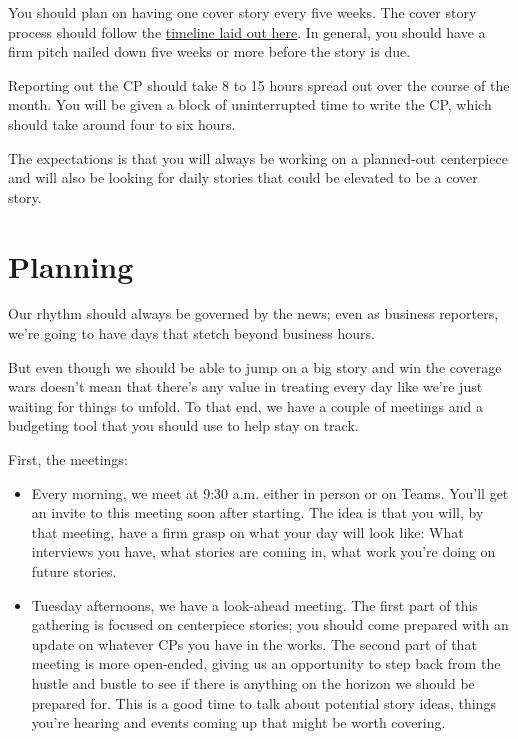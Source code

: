 \documentclass[
  11pt,
  american,
  letterpaperpaper,
  extrafontsizes,onecolumn,openright
  ]{memoir}
\providecommand{\tightlist}{%
  \setlength{\itemsep}{0pt}\setlength{\parskip}{0pt}}
\begin{document}
You should plan on having one cover story every five weeks. The cover story process should follow the \href{https://docs.google.com/spreadsheets/d/1NA5khaUA2TEatah0DSByH2hUVMbGpzMzeFEqfeBC0-Q/edit\#gid=1493329012}{timeline laid out here}. In general, you should have a firm pitch nailed down five weeks or more before the story is due.

Reporting out the CP should take 8 to 15 hours spread out over the course of the month. You will be given a block of uninterrupted time to write the CP, which should take around four to six hours.

The expectations is that you will always be working on a planned-out centerpiece and will also be looking for daily stories that could be elevated to be a cover story.

\hypertarget{planning}{%
\section*{Planning}\label{planning}}

Our rhythm should always be governed by the news; even as business reporters, we're going to have days that stetch beyond business hours.

But even though we should be able to jump on a big story and win the coverage wars doesn't mean that there's any value in treating every day like we're just waiting for things to unfold. To that end, we have a couple of meetings and a budgeting tool that you should use to help stay on track.

First, the meetings:

\begin{itemize}
\tightlist
\item
  Every morning, we meet at 9:30 a.m. either in person or on Teams. You'll get an invite to this meeting soon after starting. The idea is that you will, by that meeting, have a firm grasp on what your day will look like: What interviews you have, what stories are coming in, what work you're doing on future stories.
\item
  Tuesday afternoons, we have a look-ahead meeting. The first part of this gathering is focused on centerpiece stories; you should come prepared with an update on whatever CPs you have in the works. The second part of that meeting is more open-ended, giving us an opportunity to step back from the hustle and bustle to see if there is anything on the horizon we should be prepared for. This is a good time to talk about potential story ideas, things you're hearing and events coming up that might be worth covering.
\end{itemize}
\end{document}
